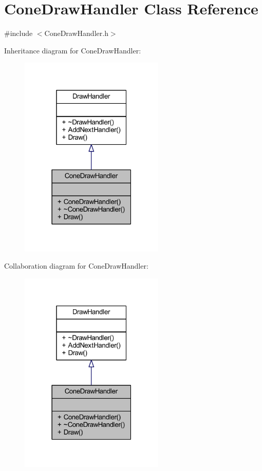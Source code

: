 \hypertarget{class_cone_draw_handler}{}\section{Cone\+Draw\+Handler Class Reference}
\label{class_cone_draw_handler}


{\ttfamily \#include $<$Cone\+Draw\+Handler.\+h$>$}



Inheritance diagram for Cone\+Draw\+Handler\+:\nopagebreak
\begin{figure}[H]
\begin{center}
\leavevmode
\includegraphics[width=195pt]{class_cone_draw_handler__inherit__graph}
\end{center}
\end{figure}


Collaboration diagram for Cone\+Draw\+Handler\+:\nopagebreak
\begin{figure}[H]
\begin{center}
\leavevmode
\includegraphics[width=195pt]{class_cone_draw_handler__coll__graph}
\end{center}
\end{figure}

